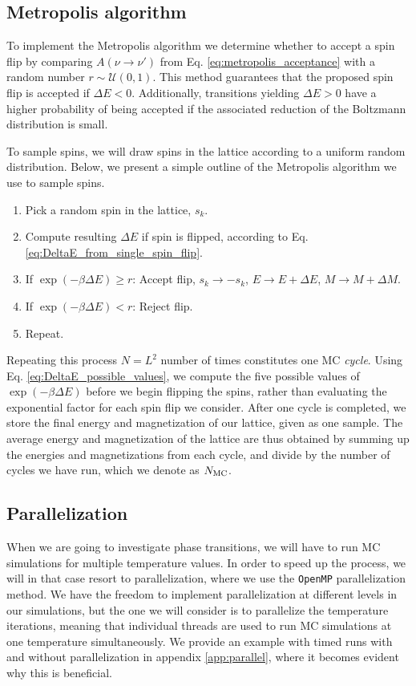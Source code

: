 \subsection{Metropolis algorithm}\label{subsec_implementations:metropolis}
To implement the Metropolis algorithm we determine whether to accept a spin flip by comparing $A(\nu\to\nu')$ from Eq. \eqref{eq:metropolis_acceptance} with a random number $r\sim \mathcal{U}(0,1)$. This method guarantees that the proposed spin flip is accepted if $\Delta E<0$. Additionally, transitions yielding $\Delta E>0$ have a higher probability of being accepted if the associated reduction of the Boltzmann distribution is small. 

To sample spins, we will draw spins in the lattice according to a uniform random distribution. Below, we present a simple outline of the Metropolis algorithm we use to sample spins. 
\begin{enumerate}
    \item Pick a random spin in the lattice, $s_k$.
    \item Compute resulting $\Delta E$ if spin is flipped, according to Eq. \eqref{eq:DeltaE_from_single_spin_flip}.  
    \item If $\exp(-\beta\Delta E) \geq r$: Accept flip, 
    \subitem $s_k\to-s_k$, 
    \subitem $E\to E+\Delta E$, 
    \subitem$M\to M+\Delta M$. 
    \item If $\exp(-\beta\Delta E)<r$: Reject flip.
    \item Repeat.   
\end{enumerate} 
Repeating this process $N=L^2$ number of times constitutes one MC \textit{cycle}. Using Eq. \eqref{eq:DeltaE_possible_values}, we compute the five possible values of $\exp(-\beta\Delta E)$ before we begin flipping the spins, rather than evaluating the exponential factor for each spin flip we consider. After one cycle is completed, we store the final energy and magnetization of our lattice, given as one sample. The average energy and magnetization of the lattice are thus obtained by summing up the energies and magnetizations from each cycle, and divide by the number of cycles we have run, which we denote as $N_\mathrm{MC}$. 

\subsection{Parallelization}\label{subsec_implementations:parallelization}
When we are going to investigate phase transitions, we will have to run MC simulations for multiple temperature values. In order to speed up the process, we will in that case resort to parallelization, where we use the \texttt{OpenMP} parallelization method. We have the freedom to implement parallelization at different levels in our simulations, but the one we will consider is to parallelize the temperature iterations, meaning that individual threads are used to run MC simulations at one temperature simultaneously. We provide an example with timed runs with and without parallelization in appendix \ref{app:parallel}, where it becomes evident why this is beneficial. 


